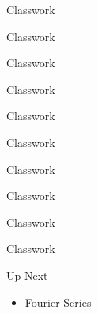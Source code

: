 \documentclass[aspectratio=169,xcolor=dvipsnames,svgnames,x11names,fleqn]{beamer}
\begin{document}
\begin{frame}{Classwork}
    
\end{frame}

\begin{frame}{Classwork}
    
\end{frame}
\begin{frame}{Classwork}
    
\end{frame}
\begin{frame}{Classwork}
    
\end{frame}
\begin{frame}{Classwork}
    
\end{frame}
\begin{frame}{Classwork}
    
\end{frame}
\begin{frame}{Classwork}
    
\end{frame}
\begin{frame}{Classwork}
    
\end{frame}
\begin{frame}{Classwork}
    
\end{frame}
\begin{frame}{Classwork}
    
\end{frame}


\begin{frame}{Up Next}
\begin{itemize}
	\item Fourier Series
\end{itemize}
    
\end{frame}
\end{document}
